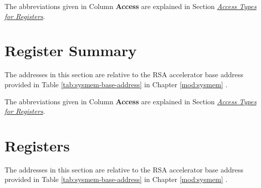 \documentclass[main\_\_EN.tex]{subfiles}
\begin{document}
The abbreviations given in Column \textbf{Access} are explained in Section \hyperref[glossary-access-types]{\textit{Access Types for Registers}}.






\hypertarget{rsa-reg-summ}{}
\section{Register Summary}
\label{sec:rsa-reg-summ}


The addresses in this section are relative to the RSA accelerator base address provided in Table \ref{tab:sysmem-base-address} in Chapter \ref{mod:sysmem} \textit{}.

The abbreviations given in Column \textbf{Access} are explained in Section \hyperref[glossary-access-types]{\textit{Access Types for Registers}}.





\clearpage
\section{Registers}

The addresses in this section are relative to the RSA accelerator base address provided in Table \ref{tab:sysmem-base-address} in Chapter \ref{mod:sysmem} \textit{}.


\end{document}
